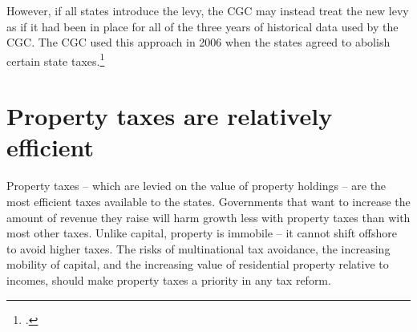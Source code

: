 \documentclass[twoside,english]{grattanBudgetRepairb5portrait}
\begin{document}
However, if all states introduce the levy, the CGC may instead treat the new levy as if it had been in place for all of the three years of historical data used by the CGC\@. The CGC used this approach in 2006 when the states agreed to abolish certain state taxes.\footcite[][23]{CGC2015-Volume2}  

\chapter{Property taxes are relatively efficient}
Property taxes – which are levied on the value of property holdings – are the most efficient taxes available to the states. Governments that want to increase the amount of revenue they raise will harm growth less with property taxes than with most other taxes. Unlike capital, property is immobile – it cannot shift offshore to avoid higher taxes. The risks of multinational tax avoidance, the increasing mobility of capital, and the increasing value of residential property relative to incomes, should make property taxes a priority in any tax reform. 
\end{document}
